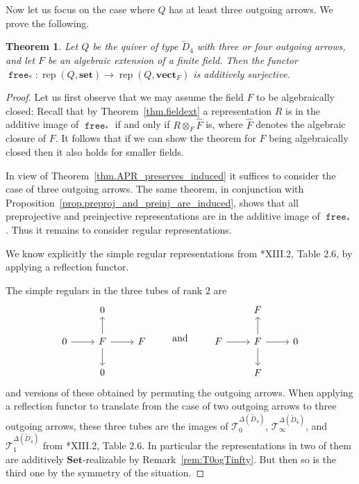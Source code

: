 \documentclass[a4paper]{amsart}
\theoremstyle{plain}
\newtheorem{theorem}{Theorem}[section]
\theoremstyle{definition}
\theoremstyle{remark}
\newcommand{\funct}[1]{\operatorname{\mathtt{#1}}}
\newcommand{\Set}{\mathbf{Set}}
\newcommand{\set}{\mathbf{set}}
\newcommand{\vectF}{\mathbf{vect}_F}
\DeclareMathOperator{\rep}{rep}
\begin{document}
Now let us focus on the case where \( Q \) has at least three outgoing arrows. We prove the following.

\begin{theorem} \label{thm:D4_three_outgoing}
Let $Q$ be the quiver of type $\tilde{D}_4$ with three or four outgoing arrows, and let $F$ be an algebraic extension of a finite field. Then the functor $\funct{free}_* \colon \rep(Q, \set)\to \rep(Q, \vectF)$ is additively surjective.
\end{theorem}

\begin{proof}
Let us first observe that we may assume the field \( F \) to be algebraically closed: Recall that by Theorem~\ref{thm.fieldext} a representation \( R \) is in the additive image of \( \funct{free}_* \) if and only if \( R \otimes_F \widehat{F} \) is, where \( \widehat{F} \) denotes the algebraic closure of \( F \). It follows that if we can show the theorem for \( F \) being algebraically closed then it also holds for smaller fields.

In view of Theorem~\ref{thm.APR_preserves_induced} it suffices to consider the case of three outgoing arrows. The same theorem, in conjunction with Proposition~\ref{prop.preproj_and_preinj_are_induced}, shows that all preprojective and preinjective representations are in the additive image of \( \funct{free}_* \). Thus it remains to consider regular representations.

We know explicitly the simple regular representations from \cite{RepresentationTheoryOfArtinAlgebrasII}*{XIII.2, Table 2.6}, by applying a reflection functor.

The simple regulars in the three tubes of rank \( 2 \) are
\[ \begin{tikzcd}
& 0 & \\
0 \ar[r] & F \ar[r] \ar[u] \ar[d] & F \\
& 0 & 
\end{tikzcd}
\qquad \text{ and } \qquad 
\begin{tikzcd}
& F & \\
F \ar[r] & F \ar[r] \ar[u] \ar[d] & 0 \\
& F & 
\end{tikzcd} \]
and versions of these obtained by permuting the outgoing arrows. When applying a reflection functor to translate from the case of two outgoing arrows to three outgoing arrows, these three tubes are the images of \( \mathcal{T}_0^{\Delta(\tilde{D}_4)} \), \( \mathcal{T}_\infty^{\Delta(\tilde{D}_4)} \), and \( \mathcal{T}_1^{\Delta(\tilde{D}_4)} \) from \cite{RepresentationTheoryOfArtinAlgebrasII}*{XIII.2, Table 2.6}. In particular the representations in two of them are additively \( \Set \)-realizable by Remark~\ref{rem:T0ogTinfty}. But then so is the third one by the symmetry of the situation.


\end{proof}
\end{document}
